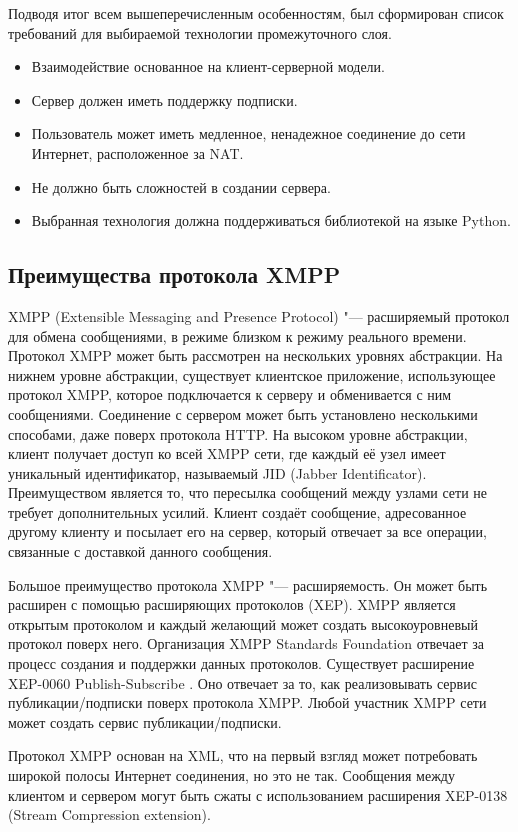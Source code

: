 Подводя итог всем вышеперечисленным особенностям, был сформирован список
требований для выбираемой технологии промежуточного слоя.
\begin{itemize}
\item Взаимодействие основанное на клиент-серверной модели.
\item Сервер должен иметь поддержку подписки.
\item Пользователь может иметь медленное, ненадежное соединение до
сети Интернет, расположенное за NAT.
\item Не должно быть сложностей в создании сервера.
\item Выбранная технология должна поддерживаться библиотекой на языке
Python.
\end{itemize}

\subsection{Преимущества протокола XMPP}
XMPP (Extensible Messaging and Presence Protocol) "--- расширяемый протокол для
обмена сообщениями, в режиме близком к режиму реального времени. Протокол XMPP
может быть рассмотрен на нескольких уровнях абстракции. На нижнем уровне
абстракции, существует клиентское приложение, использующее протокол XMPP,
которое подключается к серверу и обменивается с ним сообщениями. Соединение с
сервером может быть установлено несколькими способами, даже поверх протокола
HTTP. На высоком уровне абстракции, клиент получает доступ ко всей XMPP сети,
где каждый её узел имеет уникальный идентификатор, называемый JID (Jabber
Identificator). Преимуществом является то, что пересылка сообщений между узлами
сети не требует дополнительных усилий. Клиент создаёт сообщение, адресованное
другому клиенту и посылает его на сервер, который отвечает за все операции,
связанные с доставкой данного сообщения.

Большое преимущество протокола XMPP "--- расширяемость. Он может быть расширен
с помощью расширяющих протоколов (XEP). XMPP является открытым протоколом и
каждый желающий может создать высокоуровневый протокол поверх него. Организация
XMPP Standards Foundation отвечает за процесс создания и поддержки данных
протоколов. Существует расширение XEP-0060 Publish-Subscribe \cite{xep-0060}.
Оно отвечает за то, как реализовывать сервис публикации/подписки поверх
протокола XMPP. Любой участник XMPP сети может создать сервис
публикации/подписки.

Протокол XMPP основан на XML, что на первый взгляд может потребовать широкой
полосы Интернет соединения, но это не так. Сообщения между клиентом и сервером
могут быть сжаты с использованием расширения XEP-0138 (Stream Compression
extension).

